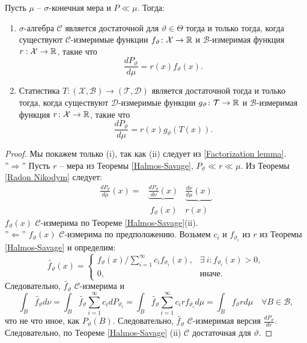 \begin{thm} \label{Neyman criterion} Пусть $\mu$ -- $\sigma$-конечная мера и $P \ll \mu$. Тогда:
	\begin{enumerate}
		\item $\sigma$-алгебра $\mathcal{C}$ является достаточной для $\vartheta \in \Theta$ тогда и только тогда, когда существуют $\mathcal{C}$-измеримые функции $f_\vartheta\colon\mathcal{X} \rightarrow \mathbb{R}$ и $\mathcal{B}$-измеримая функция $r:\mathcal{X} \rightarrow \mathbb{R}$, такие что
		\[ \frac{dP_\vartheta}{d\mu}=r(x)f_\vartheta(x). \]
		\item Статистика $T\colon(\mathcal{X},\mathcal{B}) \rightarrow (\mathcal{T},\mathcal{D})$ является достаточной тогда и только тогда, когда существуют $\mathcal{D}$-измеримые функции $g_\vartheta\colon\mathcal{T} \rightarrow \mathbb{R}$ и $\mathcal{B}$-измеримая функция $r\colon\mathcal{X} \rightarrow \mathbb{R}$, такие что
		\[\frac{dP_\vartheta}{d\mu}=r(x)g_\vartheta(T(x)). \]
	\end{enumerate}
\end{thm}
\begin{proof}
	Мы покажем только (i), так как (ii) следует из \ref{Factorization lemma}. \\
	''$\Longrightarrow$'' Пусть $r$ -- мера из Теоремы \ref{Halmos-Savage}, $P_\vartheta \ll r \ll \mu$. Из Теоремы \ref{Radon Nikodym} следует:
	\[
	\begin{aligned}
	\frac{dP_\vartheta}{d \mu}(x) = & \underbrace{\frac{d P_\vartheta}{d \nu}(x)} & \underbrace{\frac{d \nu}{d \mu}(x)} \\
    &\ f_\vartheta(x) & r(x) \
	\end{aligned} \] 
	$f_\vartheta(x)$ $\mathcal{C}$-измерима по Теореме \ref{Halmos-Savage}(ii). \\
	''$\Longleftarrow$''
	$f_\vartheta(x)$ $\mathcal{C}$-измерима по предположению. Возьмем $c_i$ и $f_{\vartheta_i}$ из $r$ из Теоремы \ref{Halmos-Savage} и определим:
	\[ \widetilde{f_\vartheta}(x) =
	\left \{
	\begin{array}{cl}
	f_\vartheta(x) / \sum_{i=1}^{\infty} c_i f_{\vartheta_i}(x) , & \exists\ i: f_{\vartheta_i}(x) > 0, \\
	0, & \text{иначе}.
	\end{array}
	\right.
	\]
	Следовательно, $\widetilde{f_\vartheta}$ $\mathcal{C}$-измерима и
	\[ \int_B  \widetilde{f_\vartheta}d\nu = \int_B \widetilde{f_\vartheta} \sum_{i=1}^{\infty} c_i dP_{\vartheta_i} = \int_B \widetilde{f_\vartheta} \sum_{i=1}^{\infty} c_i r f_{\vartheta_i}d\mu = \int_B f_\vartheta r d\mu \quad \forall B \in \mathcal{B},  \]
	что не что иное, как $P_\vartheta(B)$. Следовательно, $\widetilde{f_\vartheta}$ $\mathcal{C}$-измеримая версия $\frac{dP_\vartheta}{dr}$. Следовательно, по Теореме \ref{Halmos-Savage} (ii) $\mathcal{C}$ достаточная для $\vartheta$.
\end{proof}

